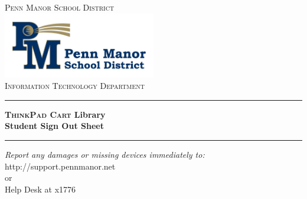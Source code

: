 \begin{titlepage}

\begin{center}

\textsc{\LARGE Penn Manor School District}\\[1.5cm]


\includegraphics[width=0.5\textwidth]{images/logo}\\[1cm]


\textsc{\Large Information Technology Department}\\[0.5cm]


\hrule
{\huge \bfseries \textsc{ThinkPad Cart} Library\\ \vspace{0.5cm} Student Sign Out Sheet}\\[0.4cm]

\hrule


\vfill
\begin{center} \large
\emph{Report any damages or missing devices immediately to:}\\
http://support.pennmanor.net \\or\\Help Desk at x1776
\end{center}


\vfill

\end{center}

\end{titlepage}
